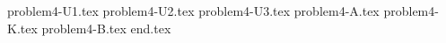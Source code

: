 \documentclass{../../../../style/mkimain}
\begin{document}
{problem4-U1.tex}
{problem4-U2.tex}
{problem4-U3.tex}
\newpage
{problem4-A.tex}
{problem4-K.tex}
\newpage
{problem4-B.tex}
{end.tex}
\end{document}
